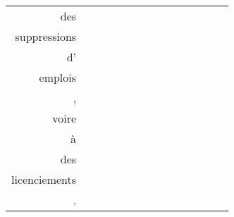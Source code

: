 \documentclass{article}
\begin{document}
\begin{tabular}{r*{13}{|@{}c@{}}|}
des & &&&&&&&&&&&& \\
suppressions & &&&&&&&&&&&& \\
d' & &&&&&&&&&&&& \\
emplois & &&&&&&&&&\raisebox{-1ex}{\color{red}\rule{2.8ex}{2.8ex}}&&& \\
, & &&&&&&&&&&&& \\
voire & &&&&&&&&&&&& \\
à & &&&&&&&&&&&& \\
des & &&&&&&&&&&&& \\
licenciements & &&&&&&&&&&&& \\
. & &&&&&&&&&&&&\raisebox{-1ex}{\rule{2.8ex}{2.8ex}} \\
\end{tabular}\\\vspace{3em}
\end{document}
